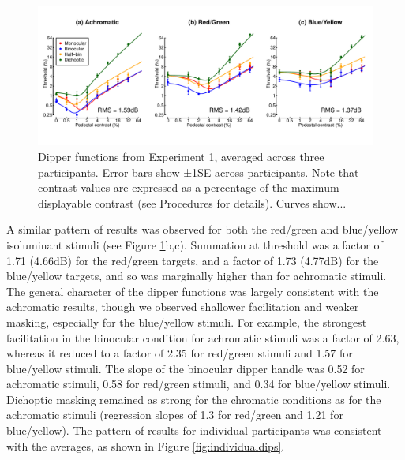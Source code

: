 \documentclass[
]{article}
\begin{document}
\begin{figure}

{\centering \includegraphics{Figures/dipperssimplex} 

}

\caption{Dipper functions from Experiment 1, averaged across three participants. Error bars show ±1SE across participants. Note that contrast values are expressed as a percentage of the maximum displayable contrast (see Procedures for details). Curves show...}\label{fig:dipperfig}
\end{figure}

A similar pattern of results was observed for both the red/green and blue/yellow isoluminant stimuli (see Figure \ref{fig:dipperfig}b,c). Summation at threshold was a factor of 1.71 (4.66dB) for the red/green targets, and a factor of 1.73 (4.77dB) for the blue/yellow targets, and so was marginally higher than for achromatic stimuli. The general character of the dipper functions was largely consistent with the achromatic results, though we observed shallower facilitation and weaker masking, especially for the blue/yellow stimuli. For example, the strongest facilitation in the binocular condition for achromatic stimuli was a factor of 2.63, whereas it reduced to a factor of 2.35 for red/green stimuli and 1.57 for blue/yellow stimuli. The slope of the binocular dipper handle was 0.52 for achromatic stimuli, 0.58 for red/green stimuli, and 0.34 for blue/yellow stimuli. Dichoptic masking remained as strong for the chromatic conditions as for the achromatic stimuli (regression slopes of 1.3 for red/green and 1.21 for blue/yellow). The pattern of results for individual participants was consistent with the averages, as shown in Figure \ref{fig:individualdips}.
\end{document}
